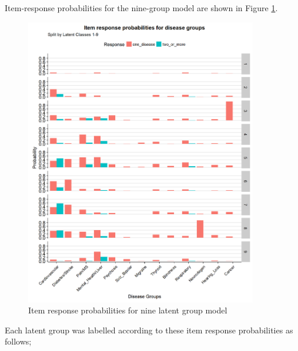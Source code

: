 \documentclass[12pt,]{report}
\begin{document}
Item-response probabilities for the nine-group model are shown in Figure
\ref{fig:item-response}.

\begin{figure}
  \centering
    \includegraphics[width=0.9\textwidth]{figures/item-response.png}
  \caption{Item response probabilities for nine latent group model}
  \label{fig:item-response}
\end{figure}

Each latent group was labelled according to these item response
probabilities as follows;
\end{document}
